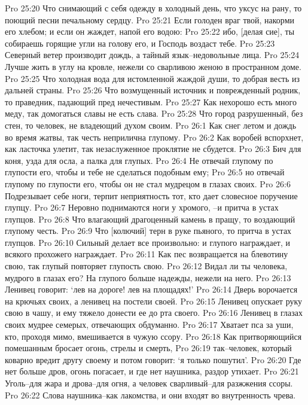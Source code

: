 Pro 25:20  Что снимающий с себя одежду в холодный день, что уксус на рану, то поющий песни печальному сердцу.
Pro 25:21  Если голоден враг твой, накорми его хлебом; и если он жаждет, напой его водою:
Pro 25:22  ибо, [делая сие], ты собираешь горящие угли на голову его, и Господь воздаст тебе.
Pro 25:23  Северный ветер производит дождь, а тайный язык--недовольные лица.
Pro 25:24  Лучше жить в углу на кровле, нежели со сварливою женою в пространном доме.
Pro 25:25  Что холодная вода для истомленной жаждой души, то добрая весть из дальней страны.
Pro 25:26  Что возмущенный источник и поврежденный родник, то праведник, падающий пред нечестивым.
Pro 25:27  Как нехорошо есть много меду, так домогаться славы не есть слава.
Pro 25:28  Что город разрушенный, без стен, то человек, не владеющий духом своим.
Pro 26:1  Как снег летом и дождь во время жатвы, так честь неприлична глупому.
Pro 26:2  Как воробей вспорхнет, как ласточка улетит, так незаслуженное проклятие не сбудется.
Pro 26:3  Бич для коня, узда для осла, а палка для глупых.
Pro 26:4  Не отвечай глупому по глупости его, чтобы и тебе не сделаться подобным ему;
Pro 26:5  но отвечай глупому по глупости его, чтобы он не стал мудрецом в глазах своих.
Pro 26:6  Подрезывает себе ноги, терпит неприятность тот, кто дает словесное поручение глупцу.
Pro 26:7  Неровно поднимаются ноги у хромого, --и притча в устах глупцов.
Pro 26:8  Что влагающий драгоценный камень в пращу, то воздающий глупому честь.
Pro 26:9  Что [колючий] терн в руке пьяного, то притча в устах глупцов.
Pro 26:10  Сильный делает все произвольно: и глупого награждает, и всякого прохожего награждает.
Pro 26:11  Как пес возвращается на блевотину свою, так глупый повторяет глупость свою.
Pro 26:12  Видал ли ты человека, мудрого в глазах его? На глупого больше надежды, нежели на него.
Pro 26:13  Ленивец говорит: `лев на дороге! лев на площадях!'
Pro 26:14  Дверь ворочается на крючьях своих, а ленивец на постели своей.
Pro 26:15  Ленивец опускает руку свою в чашу, и ему тяжело донести ее до рта своего.
Pro 26:16  Ленивец в глазах своих мудрее семерых, отвечающих обдуманно.
Pro 26:17  Хватает пса за уши, кто, проходя мимо, вмешивается в чужую ссору.
Pro 26:18  Как притворяющийся помешанным бросает огонь, стрелы и смерть,
Pro 26:19  так--человек, который коварно вредит другу своему и потом говорит: `я только пошутил'.
Pro 26:20  Где нет больше дров, огонь погасает, и где нет наушника, раздор утихает.
Pro 26:21  Уголь--для жара и дрова--для огня, а человек сварливый--для разжжения ссоры.
Pro 26:22  Слова наушника--как лакомства, и они входят во внутренность чрева.
